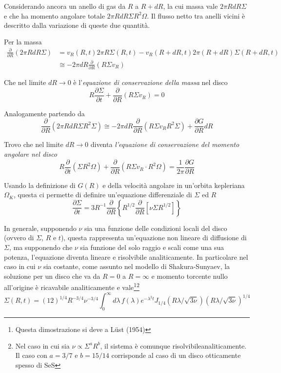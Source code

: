 \documentclass[a4paperbi]{article}
\begin{document}
	Considerando ancora un anello di gas da $R$ a $R+dR$, la cui massa vale $2\pi RdR\Sigma$ e che ha momento angolare totale $2\pi RdR\Sigma R^2\Omega$. Il flusso netto tra anelli vicini è descritto dalla variazione di queste due quantità. 
	
	Per la massa
	\begin{align*}
		\frac{\partial}{\partial R}(2\pi RdR\Sigma)&=v_R(R,t)2\pi R\Sigma(R,t)-v_R(R+dR,t)2\pi(R+dR)\Sigma(R+dR,t)\\
		&\cong-2\pi dR\frac{\partial}{\partial R}(R\Sigma v_R)
	\end{align*}
	
	Che nel limite $dR\rightarrow 0$ è l'\textit{equazione di conservazione della massa} nel disco
	\begin{equation}
		R\frac{\partial\Sigma}{\partial t}+\frac{\partial}{\partial R}(R\Sigma v_R)=0
	\end{equation}
	
	Analogamente partendo da
	\begin{equation*}
		\frac{\partial}{\partial R}(2\pi RdR\Sigma R^2\Sigma)\cong-2\pi dR\frac{\partial}{\partial R}(R\Sigma v_R R^2\Sigma)+\frac{\partial G}{\partial R}dR	
	\end{equation*}
	
	Trovo che nel limite $dR\rightarrow 0$ diventa \textit{l'equazione di conservazione del momento angolare nel disco}
	\begin{equation}
		R\frac{\partial}{\partial t}(\Sigma R^2\Omega)+\frac{\partial}{\partial R}(R\Sigma v_R\cdot R^2\Omega)=\frac{1}{2\pi}\frac{\partial G}{\partial R}
	\end{equation}
	
	Usando la definizione di $G(R)$ e della velocità angolare in un'orbita kepleriana $\Omega_K$,  questa ci permette di definire un'equazione differenziale di $\Sigma$ ed $R$
	\begin{equation}
		\frac{\partial\Sigma}{\partial t}=3R^{-1}\frac{\partial}{\partial R}\left\{R^{1/2}\frac{\partial}{\partial R}\left[\nu\Sigma R^{1/2}\right]\right\}
	\end{equation}
	
	In generale, supponendo $\nu$ sia una funzione delle condizioni locali del disco (ovvero di $\Sigma$, $R$ e $t$), questa rappresenta un'equazione non lineare di diffusione di $\Sigma$, ma supponendo che $\nu$ sia funzione del solo raggio e scali come una sua potenza, l'equazione diventa lineare e risolvibile analiticamente. In particolare nel caso in cui $\nu$ sia costante, come assunto nel modello di Shakura-Sunyaev, la soluzione per un disco che va da $R=0$ a $R=\infty$ e momento torcente nullo all'origine è ricavabile analiticamente e vale\footnote{Questa dimostrazione si deve a Lüst (1954)}\footnote{Nel caso in cui sia $\nu\propto\Sigma^aR^b$, il sistema è comunque risolvibileanaliticamente. Il caso con $a=3/7$ e $b=15/14$ corrisponde al caso di un disco otticamente spesso di SeS}
	\begin{equation*}
		\Sigma(R,t)=(12)^{1/4}R^{-3/4}\nu^{-3/4}\int^{\infty}_0d\lambda\,f(\lambda)e^{-\lambda^2t}J_{1/4}(R\lambda/\sqrt{3\nu})(R\lambda/\sqrt{3\nu})^{1/4}
	\end{equation*}
	
\end{document}
